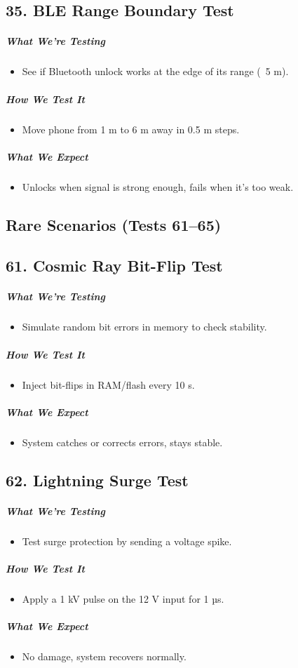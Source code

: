 \subsection*{35. BLE Range Boundary Test}
\subparagraph{What We’re Testing}
\begin{itemize}
    \item See if Bluetooth unlock works at the edge of its range (~5 m).
\end{itemize}
\subparagraph{How We Test It}
\begin{itemize}
    \item Move phone from 1 m to 6 m away in 0.5 m steps.
\end{itemize}
\subparagraph{What We Expect}
\begin{itemize}
    \item Unlocks when signal is strong enough, fails when it’s too weak.
\end{itemize}

\newpage
\subsection*{Rare Scenarios (Tests 61–65)}

\subsection*{61. Cosmic Ray Bit-Flip Test}
\subparagraph{What We’re Testing}
\begin{itemize}
    \item Simulate random bit errors in memory to check stability.
\end{itemize}
\subparagraph{How We Test It}
\begin{itemize}
    \item Inject bit-flips in RAM/flash every 10 s.
\end{itemize}
\subparagraph{What We Expect}
\begin{itemize}
    \item System catches or corrects errors, stays stable.
\end{itemize}

\subsection*{62. Lightning Surge Test}
\subparagraph{What We’re Testing}
\begin{itemize}
    \item Test surge protection by sending a voltage spike.
\end{itemize}
\subparagraph{How We Test It}
\begin{itemize}
    \item Apply a 1 kV pulse on the 12 V input for 1 µs.
\end{itemize}
\subparagraph{What We Expect}
\begin{itemize}
    \item No damage, system recovers normally.
\end{itemize}


